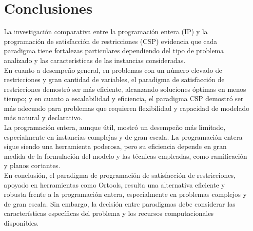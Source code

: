 \documentclass[12pt]{report}
\begin{document}
\chapter{Conclusiones}

La investigación comparativa entre la programación entera (IP) y la programación de satisfacción de restricciones (CSP) evidencia que cada paradigma tiene fortalezas particulares dependiendo del tipo de problema analizado y las características de las instancias consideradas. \\

En cuanto a desempeño general, en problemas con un número elevado de restricciones y gran cantidad de variables, el paradigma de satisfacción de restricciones demostró ser más eficiente, alcanzando soluciones óptimas en menos tiempo; y en cuanto a escalabilidad y eficiencia, el paradigma CSP demostró ser más adecuado para problemas que requieren flexibilidad y capacidad de modelado más natural y declarativo. \\

La programación entera, aunque útil, mostró un desempeño más limitado, especialmente en instancias complejas y de gran escala. La programación entera sigue siendo una herramienta poderosa, pero su eficiencia depende en gran medida de la formulación del modelo y las técnicas empleadas, como ramificación y planos cortantes.\\

En conclusión, el paradigma de programación de satisfacción de restricciones, apoyado en herramientas como Ortools, resulta una alternativa eficiente y robusta frente a la programación entera, especialmente en problemas complejos y de gran escala. Sin embargo, la decisión entre paradigmas debe considerar las características específicas del problema y los recursos computacionales disponibles.

% 
% 
\end{document}
